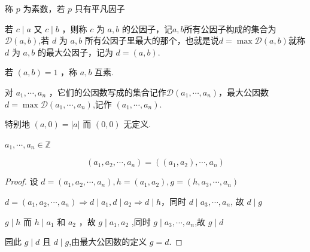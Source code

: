 \begin{definition}\label{p1:concept:c1-l98}
	称 $p$ 为素数，若 $p$ 只有平凡因子
\end{definition}
\begin{definition}\label{p1:concept:c1-l101}
	若 $c \mid a$ 又 $c \mid b$ ，则称 $c$ 为 $a,b$ 的公因子，记$a,b$所有公因子构成的集合为$\mathscr{D}(a,b)$,若 $d$ 为 $a, b$ 所有公因子里最大的那个，也就是说$d=\max\mathscr{D}(a,b)$就称 $d$ 为 $a, b$ 的最大公因子，记为 $d=(a, b)$.
	
	若 $(a, b)=1$ ，称 $a, b$ 互素.
	
	对 $a_1, \cdots, a_n$ ，它们的公因数写成的集合记作$\mathscr{D}(a_1,\cdots,a_n)$，最大公因数$d=\max\mathscr{D}(a_1, \cdots, a_n)$,记作 $\left(a_1, \cdots, a_n\right) $.
	
	
	特别地 $(a, 0)=|a|$ 而 $(0,0)$ 无定义.
\end{definition}
\begin{theorem}
	$ a_1, \cdots, a_n \in \mathbb{Z}$
	
	$$
	\left(a_1, a_2, \cdots, a_n\right)=\left(\left(a_1, a_2\right), \cdots, a_n\right)
	$$
	
	
	
\end{theorem}
\begin{proof}
	设 $d=\left(a_1, a_2, \cdots, a_n\right) , h=\left(a_1, a_2\right) , g=\left(h, a_3, \cdots, a_n\right)$
	
	$ d=\left(a_1, a_2, \cdots, a_n\right) \Rightarrow d\mid a_1, d\mid  a_2 \Rightarrow d \mid h$，同时 $ d \mid a_3, \cdots, a_n$, 故 $d \mid g $
	
	$g \mid h$ 而 $h \mid a_1$ 和 $a_2$ ，故 $g \mid a_1, a_2$ ,同时 $g \mid a_3, \cdots, a_n$,故 $g \mid d$
	
	园此 $g \mid d$ 且 $d \mid g$,由最大公因数的定义 $g=d$.
\end{proof}

